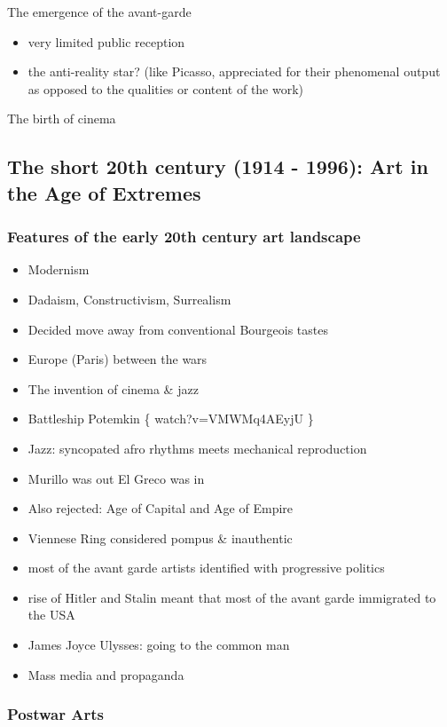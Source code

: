 \documentclass[11pt]{article}
\begin{document}
The emergence of the avant-garde 
\begin{itemize}
\item very limited public reception
\item the anti-reality star? (like Picasso, appreciated for their
phenomenal output as opposed to the qualities or content of the work)
\end{itemize}

The birth of cinema


\subsection{The short 20th century (1914 - 1996): Art in the Age of Extremes}
\label{sec:orgf56506c}
\subsubsection{Features of the early 20th century art landscape}
\label{sec:orgbaf5c4f}

\begin{itemize}
\item Modernism
\item Dadaism, Constructivism, Surrealism
\item Decided move away from conventional Bourgeois tastes
\item Europe (Paris) between the wars
\item The invention of cinema \& jazz
\item Battleship Potemkin \{ watch?v=VMWMq4AEyjU \}
\item Jazz: syncopated afro rhythms meets mechanical reproduction
\item Murillo was out El Greco was in
\item Also rejected: Age of Capital and Age of Empire
\item Viennese Ring considered pompus \& inauthentic
\item most of the avant garde artists identified with progressive politics
\item rise of Hitler and Stalin meant that most of the avant garde immigrated to the USA
\item James Joyce Ulysses: going to the common man
\item Mass media and propaganda
\end{itemize}

\subsubsection{Postwar Arts}
\label{sec:orgf58a412}
\end{document}
